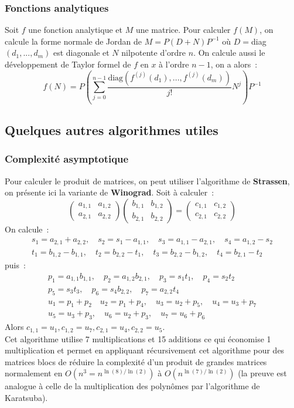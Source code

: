 \documentclass[a4paper,11pt]{article}
\begin{document}
\begin{giacjshere}
\subsubsection{Fonctions analytiques}
Soit $f$ une fonction analytique et $M$ une matrice. Pour calculer
$f(M)$, on calcule la forme normale de Jordan de 
$M=P(D+N)P^{-1}$ o\`u $D=$diag$(d_1,...,d_m)$ est diagonale et $N$ nilpotente
d'ordre $n$. On calcule
aussi le d\'eveloppement de Taylor formel de $f$ en $x$ \`a l'ordre
$n-1$, on a alors~:
\[ f(N)=P \left(\sum_{j=0}^{n-1} \frac{\mbox{diag}(f^{(j)}(d_1),...,
f^{(j)}(d_m))}{j!} N^j \right) P^{-1}\]

\subsection{Quelques autres algorithmes utiles}
\subsubsection{Complexit\'e asymptotique}
Pour calculer le produit de matrices, on peut utiliser
l'algorithme de {\bf Strassen}, on pr\'esente ici la variante
de {\bf Winograd}. Soit \`a calculer~:
\[ \left(\begin{array}{cc} a_{1,1} & a_{1,2} \\
a_{2,1} & a_{2,2} \end{array}\right) 
\left(\begin{array}{cc} b_{1,1} & b_{1,2} \\
b_{2,1} & b_{2,2} \end{array}\right)
=\left(\begin{array}{cc} c_{1,1} & c_{1,2} \\
c_{2,1} & c_{2,2} \end{array}\right)
\]
On calcule~:
\begin{eqnarray*} 
s_1=a_{2,1}+a_{2,2}, \quad s_2=s_1-a_{1,1}, \quad 
s_3=a_{1,1}- a_{2,1}, \quad s_4=a_{1,2}-s_2
\\
t_1=b_{1,2}-b_{1,1}, \quad t_2=b_{2,2}-t_1,
\quad t_3=b_{2,2}-b_{1,2}, \quad t_4=b_{2,1}-t_2
\end{eqnarray*}
puis~:
\begin{eqnarray*}
 p_1=a_{1,1} b_{1,1}, \quad
p_2=a_{1,2}b_{2,1}, \quad
p_3=s_1 t_1, \quad p_4=s_2 t_2 \\
p_5=s_3 t_3, \quad p_6=s_4 b_{2,2},
\quad p_7=a_{2,2} t_4 \\
u_1= p_1+p_2 \quad u_2=p_1+p_4,
\quad u_3=u_2+p_5, \quad u_4=u_3+p_7\\
u_5=u_3+p_3, \quad
u_6=u_2+p_3, \quad u_7=u_6+p_6
\end{eqnarray*}
Alors $c_{1,1}=u_1, c_{1,2}=u_7, c_{2,1}=u_4, c_{2,2}=u_5$.\\
Cet algorithme utilise 7 multiplications et 15 additions
ce qui \'economise 1 multiplication et permet en appliquant
r\'ecursivement cet algorithme pour des matrices blocs
de r\'eduire la complexit\'e d'un produit de grandes matrices
normalement en $O(n^3=n^{\ln(8)/\ln(2)})$ \`a $O(n^{\ln(7)/\ln(2)})$ (la preuve
est analogue \`a celle de la multiplication des polyn\^omes
par l'algorithme de Karatsuba).


\end{giacjshere}
\end{document}
